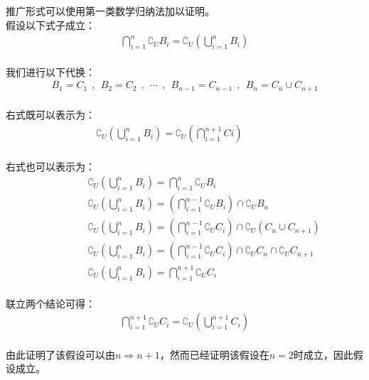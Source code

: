 \documentclass[UTF8]{ctexart}
\begin{document}
    推广形式可以使用第一类数学归纳法加以证明。\\[3mm]
    假设以下式子成立：
    \setcounter{equation}{0}
    \begin{align}
        \bigcap_{i=1}^n \complement_UB_i=\complement_U\left(\bigcup_{i=1}^n B_i\right)
    \end{align}\\
    我们进行以下代换：
    \begin{align}
        B_1=C_1~~,~~B_2=C_2~~,~~\cdots~~,~~B_{n-1}=C_{n-1}~~,~~B_n=C_n\cup C_{n+1}
    \end{align}\\
    右式既可以表示为：
    \begin{align}
        \complement_U\left(\bigcup_{i=1}^n B_i\right)=\complement_U\left(\bigcap_{i=1}^{n+1}Ci\right)~~~~~~~~~~~~~~
    \end{align}\\
    右式也可以表示为：
    \begin{align}
        &~~~~~~~~~~~~~~\complement_U\left(\bigcup_{i=1}^n B_i\right)=\bigcap_{i=1}^n\complement_U B_i\\[3mm]
        &~~~~~~~~~~~~~~\complement_U\left(\bigcup_{i=1}^n B_i\right)=\left(\bigcap_{i=1}^{n-1}\complement_U B_i\right)\cap\complement_U B_n\\[3mm]
        &~~~~~~~~~~~~~~\complement_U\left(\bigcup_{i=1}^n B_i\right)=\left(\bigcap_{i=1}^{n-1}\complement_U C_i\right)\cap\complement_U\left(C_n\cup C_{n+1}\right)\\[3mm]
        &~~~~~~~~~~~~~~\complement_U\left(\bigcup_{i=1}^n B_i\right)=\left(\bigcap_{i=1}^{n-1}\complement_U C_i\right)\cap\complement_UC_n\cap \complement_UC_{n+1}\\[3mm]
        &~~~~~~~~~~~~~~\complement_U\left(\bigcup_{i=1}^n B_i\right)=\bigcap_{i=1}^{n+1}\complement_U C_i
    \end{align}\\
    联立两个结论可得：
    \begin{align}
        \bigcap_{i=1}^{n+1} \complement_UC_i=\complement_U\left(\bigcup_{i=1}^{n+1} C_i\right)
    \end{align}\\
    由此证明了该假设可以由$n\Rightarrow n+1$，然而已经证明该假设在$n=2$时成立，因此假设成立。

\newpage
\end{document}
